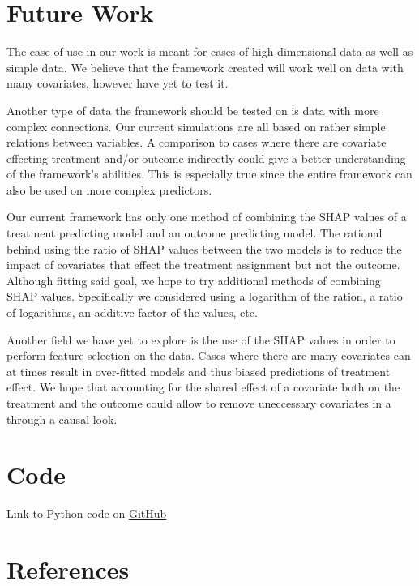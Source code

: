 \documentclass{article}
\begin{document}
\section{Future Work}
The ease of use in our work is meant for cases of high-dimensional data as well as simple data. We believe that the framework created will work well on data with many covariates, however have yet to test it.

Another type of data the framework should be tested on is data with more complex connections. Our current simulations are all based on rather simple relations between variables. A comparison to cases where there are covariate effecting treatment and/or outcome indirectly could give a better understanding of the framework's abilities. This is especially true since the entire framework can also be used on more complex predictors.

Our current framework has only one method of combining the SHAP values of a treatment predicting model and an outcome predicting model. The rational behind using the ratio of SHAP values between the two models is to reduce the impact of covariates that effect the treatment assignment but not the outcome. Although fitting said goal, we hope to try additional methods of combining SHAP values. Specifically we considered using a logarithm of the ration, a ratio of logarithms, an additive factor of the values, etc. 

Another field we have yet to explore is the use of the SHAP values in order to perform feature selection on the data. Cases where there are many covariates can at times result in over-fitted models and thus biased predictions of treatment effect. We hope that accounting for the shared effect of a covariate both on the treatment and the outcome could allow to remove uneccessary covariates in a through a causal look. 
\section{Code}
Link to Python code on \href{https://github.com/kalkairis/causal_inference_2018}{GitHub}
\section{References}



\end{document}
